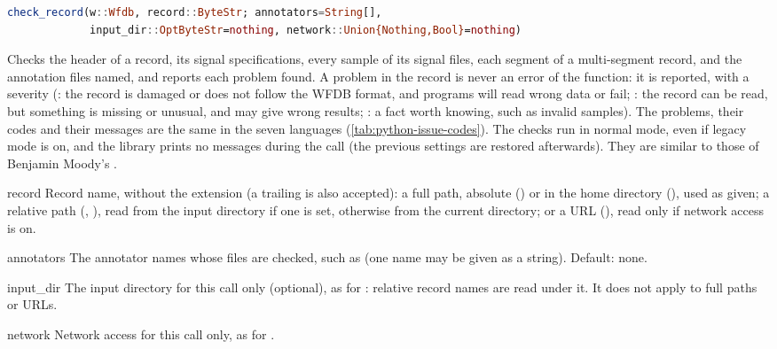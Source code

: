 \begin{lstlisting}[language=Julia,style=signature]
check_record(w::Wfdb, record::ByteStr; annotators=String[],
             input_dir::OptByteStr=nothing, network::Union{Nothing,Bool}=nothing)
\end{lstlisting}
Checks the header of a record, its signal specifications, every sample of its signal
files, each segment of a multi-segment record, and the annotation files named, and
reports each problem found. A problem in the record is never an error of the function: it
is reported, with a severity (: the record is damaged or does not follow
the WFDB format, and programs will read wrong data or fail; : the record
can be read, but something is missing or unusual, and may give wrong results;
: a fact worth knowing, such as invalid samples). The problems, their codes
and their messages are the same in the seven languages (\cref{tab:python-issue-codes}).
The checks run in normal mode, even if legacy mode is on, and the library prints no
messages during the call (the previous settings are restored afterwards). They are
similar to those of Benjamin Moody's .
\begin{params}
\item[record] Record name, without the  extension (a trailing  is
  also accepted): a full path, absolute () or in the home
  directory (), used as given; a relative path
  (, ), read from the input directory if one is set,
  otherwise from the current directory; or a URL
  (), read only if network access is
  on.
\item[annotators] The annotator names whose files are checked, such as \code{["atr"]}
  (one name may be given as a string). Default: none.
\item[input\_dir] The input directory for this call only (optional), as for
  : relative record names are read under it. It does not apply to full
  paths or URLs.
\item[network] Network access for this call only, as for .
\end{params}
